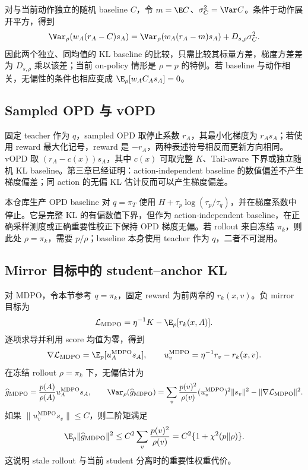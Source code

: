 对与当前动作独立的随机 baseline $C$，令 $m=\E C$、$\sigma_C^2=\Var C$。条件于动作展开平方，得到
\[
 \Var_\rho(w_A(r_A-C)s_A)
 =\Var_\rho(w_A(r_A-m)s_A)+D_{s,\rho}\sigma_C^2.
\]
因此两个独立、同均值的 KL baseline 的比较，只需比较其标量方差，梯度方差差为 $D_{s,\rho}$ 乘以该差；当前 on-policy 情形是 $\rho=p$ 的特例。若 baseline 与动作相关，无偏性的条件也相应变成 $\E_\rho[w_AC_As_A]=0$。

\subsection{Sampled OPD 与 vOPD}

固定 teacher 作为 $q$，sampled OPD 取停止系数 $r_A$，其最小化梯度为 $r_As_A$；若使用 reward 最大化记号，reward 是 $-r_A$，两种表述符号相反而更新方向相同。vOPD 取 $(r_A-c(x))s_A$，其中 $c(x)$ 可取完整 $K$、Tail-aware 下界或独立随机 KL baseline。第三章已经证明：action-independent baseline 的数值偏差不产生梯度偏差；同 action 的无偏 KL 估计反而可以产生梯度偏差。

本仓库生产 OPD baseline 对 $q=\pi_T$ 使用 $H+\tau_p\log(\tau_p/\tau_q)$，并在梯度系数中停止。它是完整 KL 的有偏数值下界，但作为 action-independent baseline，在正确采样测度或正确重要性校正下保持 OPD 梯度无偏。若 rollout 来自冻结 $\pi_k$，则此处 $\rho=\pi_k$，需要 $p/\rho$；baseline 本身使用 teacher 作为 $q$，二者不可混用。

\subsection{Mirror 目标中的 student--anchor KL}

对 MDPO，令本节参考 $q=\pi_k$，固定 reward 为前两章的 $r_k(x,v)$。负 mirror 目标为
\[
 \mathcal L_{\mathrm{MDPO}}
 =\eta^{-1}K-\E_p[r_k(x,A)].
\]
逐项求导并利用 score 均值为零，得到
\[
 \nabla\mathcal L_{\mathrm{MDPO}}
 =\E_p[u_A^{\mathrm{MDPO}}s_A],\qquad
 u_v^{\mathrm{MDPO}}=\eta^{-1}r_v-r_k(x,v).
\]
在冻结 rollout $\rho=\pi_k$ 下，无偏估计为
\[
 \widehat g_{\mathrm{MDPO}}=\frac{p(A)}{\rho(A)}u_A^{\mathrm{MDPO}}s_A,\qquad
 \Var_\rho(\widehat g_{\mathrm{MDPO}})
 =\sum_v\frac{p(v)^2}{\rho(v)}(u_v^{\mathrm{MDPO}})^2\lVert s_v\rVert^2
  -\lVert\nabla\mathcal L_{\mathrm{MDPO}}\rVert^2.
\]
如果 $\lVert u_v^{\mathrm{MDPO}}s_v\rVert\leq C$，则二阶矩满足
\begin{equation}
 \E_\rho\lVert\widehat g_{\mathrm{MDPO}}\rVert^2
 \leq C^2\sum_v\frac{p(v)^2}{\rho(v)}
 =C^2\{1+\chi^2(p\Vert\rho)\}.
 \label{eq:mdpo-variance}
\end{equation}
这说明 stale rollout 与当前 student 分离时的重要性权重代价。

